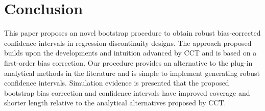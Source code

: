 \documentclass[12pt,fleqn]{article}
\begin{document}
\section{Conclusion}\label{conclusion}
This paper proposes an novel bootstrap procedure to obtain robust bias-corrected
confidence intervals in regression discontinuity designs. 
The approach proposed builds upon the developments and intuition advanced by CCT and is based on a first-order bias correction.
Our procedure provides an alternative to the plug-in analytical methods in the literature and is simple to implement generating robust confidence intervals.
Simulation evidence is presented that the proposed bootstrap bias correction and confidence intervals have improved coverage and shorter length relative to the analytical alternatives proposed by CCT.


\clearpage


\end{document}
